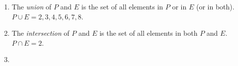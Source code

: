 {\begin{mdframed}[linewidth=4, leftmargin=40, rightmargin=40]
\begin{exercise}
\begin{enumerate}[noitemsep, label=\textbf{Step} \textbf{\arabic*}. ]
          \par 
          \item  
          \label{m39377*id110678}The \textsl{union} of
\begin{math}P\end{math} and \begin{math}E\end{math} is the set of all elements in \begin{math}P\end{math} or in \begin{math}E\end{math} (or in both). \begin{math}P\cup E=2,3,4,5,6,7,8\end{math}. \par 
          \item  
          \label{m39377*id110808}The \textsl{intersection} of \begin{math}P\end{math} and \begin{math}E\end{math} is the set of all elements in both
\begin{math}P\end{math} and \begin{math}E\end{math}. \begin{math}P\cap E=2\end{math}.
\par 
          \item  
          

\end{enumerate}
\end{exercise}
\end{mdframed}}
